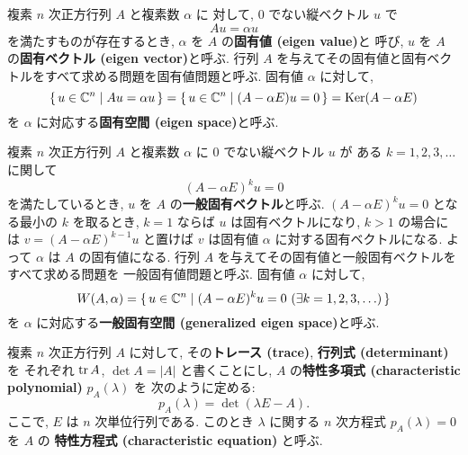 \documentclass[12pt,twoside]{jarticle}
\begin{document}
複素 $n$ 次正方行列 $A$ と複素数 $\alpha$ に
対して, $0$ でない縦ベクトル $u$ で
\begin{equation*}
  A u = \alpha u
\end{equation*}
を満たすものが存在するとき,  $\alpha$ を $A$ の{\bf 固有値 (eigen value)}と
呼び, $u$ を $A$ の{\bf 固有ベクトル (eigen vector)}と呼ぶ.
行列 $A$ を与えてその固有値と固有ベクトルをすべて求める問題を固有値問題と呼ぶ.
固有値 $\alpha$ に対して,
\begin{equation*}
  \{\, u\in{\mathbb C}^n \mid Au = \alpha u \,\}
  = \{\, u\in{\mathbb C}^n \mid (A-\alpha E)u = 0 \,\}
  = \mathop{\mathrm{Ker}}\nolimits(A - \alpha E)
\end{equation*}
を $\alpha$ に対応する{\bf 固有空間 (eigen space)}と呼ぶ.

複素 $n$ 次正方行列 $A$ と複素数 $\alpha$ に $0$ でない縦ベクトル $u$ が
ある $k=1,2,3,\ldots$ に関して
\begin{equation*}
  (A - \alpha E)^k u = 0
\end{equation*}
を満たしているとき, $u$ を $A$ の{\bf 一般固有ベクトル}と呼ぶ.
$(A - \alpha E)^k u = 0$ となる最小の $k$ を取るとき,
$k=1$ ならば $u$ は固有ベクトルになり,
$k>1$ の場合には $v = (A - \alpha E)^{k-1}u$ と置けば $v$ は固有値 $\alpha$ 
に対する固有ベクトルになる.  よって $\alpha$ は $A$ の固有値になる. 
行列 $A$ を与えてその固有値と一般固有ベクトルをすべて求める問題を
一般固有値問題と呼ぶ.  固有値 $\alpha$ に対して, 
\begin{equation*}
  W(A,\alpha) 
  = \{\, u\in{\mathbb C}^n \mid (A - \alpha E)^k u = 0 \ (\exists k = 1,2,3,\ldots)\,\}
\end{equation*}
を $\alpha$ に対応する{\bf 一般固有空間 (generalized eigen space)}と呼ぶ.

複素 $n$ 次正方行列 $A$ に対して, 
その{\bf トレース (trace)}, {\bf 行列式 (determinant)} を
それぞれ $\mathop{\mathrm{tr}}\nolimits A$, $\det A = |A|$ と書くことにし, 
$A$ の{\bf 特性多項式 (characteristic polynomial)} $p_A(\lambda)$ を
次のように定める:
\begin{equation*}
  p_A(\lambda) = \det(\lambda E - A).
\end{equation*}
ここで, $E$ は $n$ 次単位行列である. 
このとき $\lambda$ に関する $n$ 次方程式 $p_A(\lambda)=0$ を $A$ の
{\bf 特性方程式 (characteristic equation)} と呼ぶ. 
\end{document}
